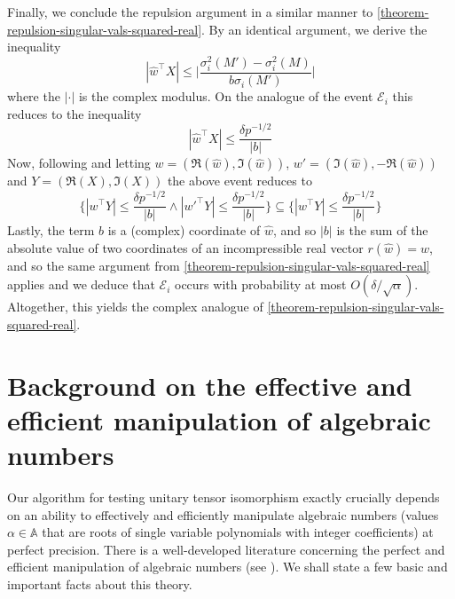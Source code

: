 \documentclass[11pt]{article}
\numberwithin{equation}{section}
\theoremstyle{remark}
\newcommand{\event}{\mathcal{E}}
\renewcommand{\AA}{\mathbb{A}}
\begin{document}
Finally, we conclude the repulsion argument in a similar manner to \cref{theorem-repulsion-singular-vals-squared-real}. By an identical argument, we derive the inequality 
\begin{equation*}
    |\hat{w}^\top  X| \leq \bigg| \frac{\sigma_i^2(M') - \sigma_i^2(M)}{b\sigma_i(M')} \bigg|
\end{equation*}
where the $|\cdot|$ is the complex modulus. On the analogue of the event $\event_i$ this reduces to the inequality 
\begin{equation*}
    |\hat{w}^\top  X| \leq \frac{\delta p^{-1/2}}{|b|}
\end{equation*}
Now, following \cite[Remark 6.3]{nguyen2015randommatricestailbounds} and letting $w = (\Re(\hat{w}), \Im(\hat{w}))$, $w' = (\Im(\hat{w}), -\Re(\hat{w}))$ and $Y = (\Re(X), \Im(X))$ the above event reduces to 
\begin{equation*}
    \{ |w^\top  Y| \leq \frac{\delta p^{-1/2}}{|b|} \wedge |w'^\top  Y| \leq \frac{\delta p^{-1/2}}{|b|} \} \subseteq \{ |w^\top  Y| \leq \frac{\delta p^{-1/2}}{|b|} \}
\end{equation*}
Lastly, the term $b$ is a (complex) coordinate of $\hat{w}$, and so $|b|$ is the sum of the absolute value of two coordinates of an incompressible real vector $r(\hat{w}) = w$, and so the same argument from \cref{theorem-repulsion-singular-vals-squared-real} applies and we deduce that $\event_i$ occurs with probability at most $O(\delta/\sqrt{\alpha})$. Altogether, this yields the complex analogue of \cref{theorem-repulsion-singular-vals-squared-real}.



\appendix

\section{Background on the effective and efficient manipulation of algebraic numbers}\label{sec:algebraicNumbers}
Our algorithm for testing unitary tensor isomorphism exactly crucially depends on an ability to effectively and efficiently manipulate algebraic numbers (values $\alpha \in \AA$ that are roots of single variable polynomials with integer coefficients) at perfect precision. There is a well-developed literature concerning the perfect and efficient manipulation of algebraic numbers (see \cite{AGAlgorithms,cohen2013course}). We shall state a few basic and important facts about this theory.
\end{document}

